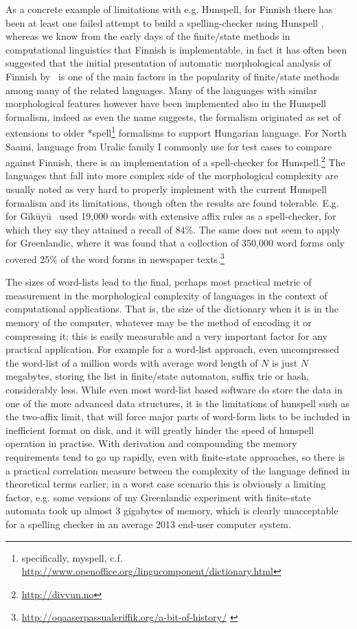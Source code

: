 \documentclass[officiallayout]{unihelcompling}
\begin{document}
As a concrete example of limitations with e.g. Hunspell, for Finnish there has
been at least one failed attempt to build a spelling-checker using Hunspell
\citep{pitkanen2006hunspell}, whereas we know from the early days of the
finite\-/state methods in computational linguistics that Finnish is
implementable, in fact it has often been suggested that the initial
presentation of automatic morphological analysis of Finnish
by~\citet{koskenniemi1983twolevel} is one of the main factors in the popularity
of finite\-/state methods among many of the related languages. Many of the
languages with similar morphological features however have been implemented
also in the Hunspell formalism, indeed as even the name suggests, the formalism
originated as set of extensions to older *spell\footnote{specifically, myspell,
c.f.  \url{http://www.openoffice.org/lingucomponent/dictionary.html}}
formalisms to support Hungarian language.  For North Saami,  language from
Uralic family I commonly use for test cases to compare against Finnish, there
is an implementation of a spell-checker for
Hunspell.\footnote{\url{http://divvun.no}} The languages that fall into
more complex side of the morphological complexity are usually noted as very
hard to properly implement with the current Hunspell formalism and its
limitations, though often the results are found tolerable. E.g. for
Gīkūyū~\citet{chege2010developing} used 19,000 words with extensive affix rules
as a spell-checker, for which they say they attained a recall of 84\%. The same
does not seem to apply for Greenlandic, where it was found that a collection of
350,000 word forms only covered 25\% of the word forms in newspaper
texts.\footnote{\url{http://oqaaserpassualeriffik.org/a-bit-of-history/}
\label{footnote:greenlandic}}

The sizes of word-lists lead to the final, perhaps most practical metric of
measurement in the morphological complexity of languages in the context of
computational applications. That is, the size of the dictionary when it is in
the memory of the computer, whatever may be the method of encoding it or
compressing it; this is easily measurable and a very important factor for any
practical application.  For example for a word-list approach, even uncompressed
the word-list of a million words with average word length of $N$ is just $N$
megabytes, storing the list in finite\-/state automaton, suffix trie or hash,
considerably less. While even most word-list based software do store the data
in one of the more advanced data structures, it is the limitations of hunspell
such as the two-affix limit, that will force major parts of word-form lists to
be included in inefficient format on disk, and it will greatly hinder the speed
of hunspell operation in practise. With derivation and compounding the memory
requirements tend to go up rapidly, even with finite-state approaches, so there
is a practical correlation measure between the complexity of the language
defined in theoretical terms earlier; in a worst case scenario this is
obviously a limiting factor, e.g. some versions of my Greenlandic experiment
with finite-state automata took up almost 3 gigabytes of memory, which is
clearly unacceptable for a spelling checker in an average 2013 end-user
computer system.
\end{document}
